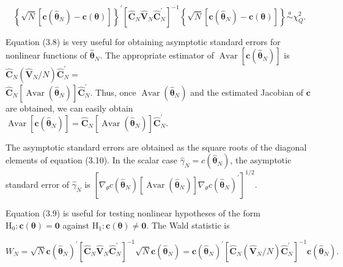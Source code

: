 \documentclass[10pt]{article}
\begin{document}
\begin{equation*}
\left\{\sqrt{N}\left[\mathbf{c}\left(\hat{\boldsymbol{\theta}}_{N}\right)-\mathbf{c}(\boldsymbol{\theta})\right]\right\}^{\prime}\left[\hat{\mathbf{C}}_{N} \hat{\mathbf{V}}_{N} \hat{\mathbf{C}}_{N}^{\prime}\right]^{-1}\left\{\sqrt{N}\left[\mathbf{c}\left(\hat{\boldsymbol{\theta}}_{N}\right)-\mathbf{c}(\boldsymbol{\theta})\right]\right\} \stackrel{a}{\sim} \chi_{Q}^{2} . \tag{3.9}
\end{equation*}


Equation (3.8) is very useful for obtaining asymptotic standard errors for nonlinear functions of $\hat{\boldsymbol{\theta}}_{N}$. The appropriate estimator of $\operatorname{Avar}\left[\mathbf{c}\left(\hat{\boldsymbol{\theta}}_{N}\right)\right]$ is $\hat{\mathbf{C}}_{N}\left(\hat{\mathbf{V}}_{N} / N\right) \hat{\mathbf{C}}_{N}^{\prime}=$\\
$\hat{\mathbf{C}}_{N}\left[\operatorname{Avar}\left(\hat{\boldsymbol{\theta}}_{N}\right)\right] \hat{\mathbf{C}}_{N}^{\prime}$. Thus, once $\operatorname{Avar}\left(\hat{\boldsymbol{\theta}}_{N}\right)$ and the estimated Jacobian of $\mathbf{c}$ are obtained, we can easily obtain\\
$\operatorname{Avar}\left[\mathbf{c}\left(\hat{\boldsymbol{\theta}}_{N}\right)\right]=\hat{\mathbf{C}}_{N}\left[\operatorname{Avar}\left(\hat{\boldsymbol{\theta}}_{N}\right)\right] \hat{\mathbf{C}}_{N}^{\prime}$.

The asymptotic standard errors are obtained as the square roots of the diagonal elements of equation (3.10). In the scalar case $\hat{\gamma}_{N}=c\left(\hat{\boldsymbol{\theta}}_{N}\right)$, the asymptotic standard error of $\hat{\gamma}_{N}$ is $\left[\nabla_{\theta} c\left(\hat{\boldsymbol{\theta}}_{N}\right)\left[\operatorname{Avar}\left(\hat{\boldsymbol{\theta}}_{N}\right)\right] \nabla_{\theta} c\left(\hat{\boldsymbol{\theta}}_{N}\right)^{\prime}\right]^{1 / 2}$.

Equation (3.9) is useful for testing nonlinear hypotheses of the form $\mathrm{H}_{0}: \mathbf{c}(\boldsymbol{\theta})=\mathbf{0}$ against $\mathrm{H}_{1}: \mathbf{c}(\boldsymbol{\theta}) \neq \mathbf{0}$. The Wald statistic is


\begin{equation*}
W_{N}=\sqrt{N} \mathbf{c}\left(\hat{\boldsymbol{\theta}}_{N}\right)^{\prime}\left[\hat{\mathbf{C}}_{N} \hat{\mathbf{V}}_{N} \hat{\mathbf{C}}_{N}^{\prime}\right]^{-1} \sqrt{N} \mathbf{c}\left(\hat{\boldsymbol{\theta}}_{N}\right)=\mathbf{c}\left(\hat{\boldsymbol{\theta}}_{N}\right)^{\prime}\left[\hat{\mathbf{C}}_{N}\left(\hat{\mathbf{V}}_{N} / N\right) \hat{\mathbf{C}}_{N}^{\prime}\right]^{-1} \mathbf{c}\left(\hat{\boldsymbol{\theta}}_{N}\right) . \tag{3.11}
\end{equation*}
\end{document}
